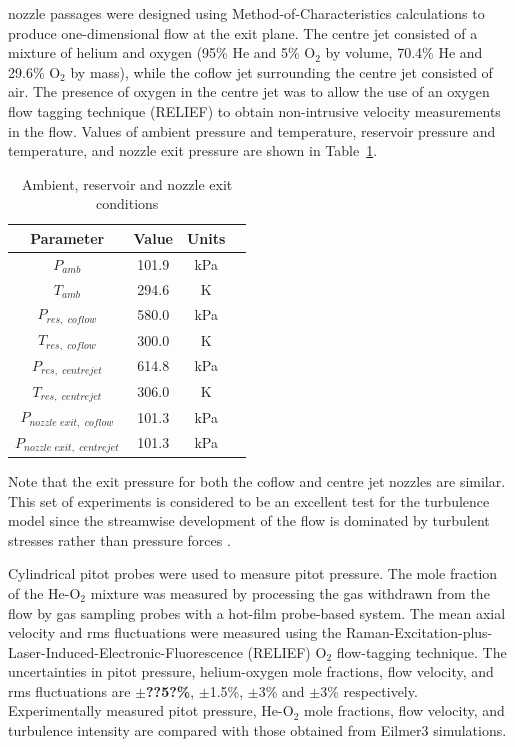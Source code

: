 %
nozzle passages were designed using Method-of-Characteristics calculations to 
produce one-dimensional flow at the exit plane. The centre jet
consisted of a mixture of helium and oxygen (95\% He and 5\% O$_2$ by
volume, 70.4\% He and 29.6\% O$_2$ by mass), while the coflow jet 
surrounding the centre jet consisted of air. The presence of oxygen 
in the centre jet was to allow the use of an oxygen flow tagging 
technique (RELIEF) to obtain non-intrusive velocity measurements 
in the flow. Values of ambient pressure and temperature, reservoir 
pressure and temperature, and nozzle exit pressure are shown in 
Table~\ref{given-conditions-coaxial-jet}. 
%
\begin{table}[h]
  \caption{Ambient, reservoir and nozzle exit conditions}
  \label{given-conditions-coaxial-jet}
  \begin{center}
    \begin{tabular}{cccl}
      \hline\hline
      Parameter & Value   & Units \\
      \hline
      $P_{amb}$             & 101.9   & kPa \\
      $T_{amb}$             & 294.6   & K   \\
      $P_{res, \,\, coflow}$     & 580.0   & kPa \\
      $T_{res, \,\, coflow}$     & 300.0   & K   \\
      $P_{res, \,\, centrejet}$  & 614.8   & kPa \\
      $T_{res, \,\, centrejet}$  & 306.0   & K   \\
      $P_{nozzle \,\, exit, \,\, coflow}$     & 101.3   & kPa \\
      $P_{nozzle \,\, exit, \,\, centrejet}$     & 101.3   & kPa \\
      \hline \hline
    \end{tabular}
  \end{center}
\end{table}
%
Note that the exit pressure for both the coflow and centre jet
nozzles are similar. This set of experiments is considered to be 
an excellent test for the turbulence model since the streamwise 
development of the flow is dominated by turbulent stresses rather 
than pressure forces \cite{Cutler2001}.

Cylindrical pitot probes were used to measure pitot pressure. 
The mole fraction of the He-O$_2$ mixture was measured by processing 
the gas withdrawn from the flow by gas sampling probes with a hot-film 
probe-based system. The mean axial velocity and rms fluctuations were 
measured using the Raman-Excitation-plus-Laser-Induced-Electronic-Fluorescence (RELIEF) 
O$_2$ flow-tagging technique. The uncertainties in pitot pressure, 
helium-oxygen mole fractions, flow velocity, and rms fluctuations are 
\textbf{$\pm$??5?\%}, $\pm$1.5\%, $\pm$3\% and $\pm$3\% respectively.
Experimentally measured pitot pressure, He-O$_2$ mole fractions,
flow velocity, and turbulence intensity are compared with those
obtained from Eilmer3 simulations.


